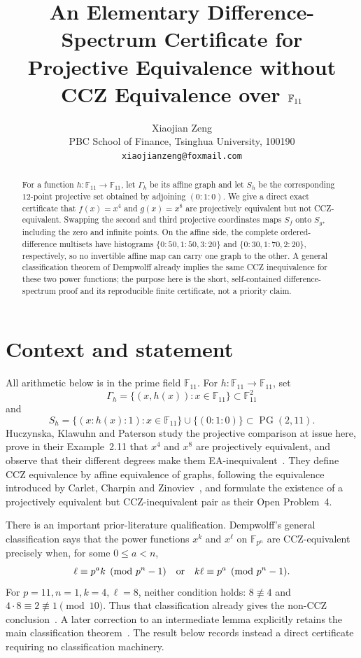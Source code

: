 \documentclass[11pt]{article}
\title{An Elementary Difference-Spectrum Certificate for\\
Projective Equivalence without CCZ Equivalence over $\F_{11}$}
\author{Xiaojian Zeng\\
PBC School of Finance, Tsinghua University, 100190\\
\texttt{xiaojianzeng@foxmail.com}}
\date{}
\newcommand{\F}{\mathbb F}
\newcommand{\PG}{\operatorname{PG}}
\begin{document}
\maketitle

\begin{abstract}
For a function $h\colon\F_{11}\to\F_{11}$, let $\Gamma_h$ be its affine
graph and let $S_h$ be the corresponding $12$-point projective set obtained
by adjoining $(0:1:0)$.  We give a direct exact certificate that
$f(x)=x^4$ and $g(x)=x^8$ are projectively equivalent but not
CCZ-equivalent.  Swapping the second and third projective coordinates maps
$S_f$ onto $S_g$, including the zero and infinite points.  On the affine
side, the complete ordered-difference multisets have histograms
$\{0:50,1:50,3:20\}$ and $\{0:30,1:70,2:20\}$, respectively, so no
invertible affine map can carry one graph to the other.  A general
classification theorem of Dempwolff already implies the same CCZ
inequivalence for these two power functions; the purpose here is the short,
self-contained difference-spectrum proof and its reproducible finite
certificate, not a priority claim.
\end{abstract}

\section{Context and statement}

All arithmetic below is in the prime field $\F_{11}$.  For
$h\colon\F_{11}\to\F_{11}$, set
\[
  \Gamma_h=\{(x,h(x)):x\in\F_{11}\}\subset\F_{11}^2
\]
and
\[
  S_h=\{(x:h(x):1):x\in\F_{11}\}\cup\{(0:1:0)\}
       \subset\PG(2,11).
\]
Huczynska, Klawuhn and Paterson study the projective comparison at
issue here, prove in their Example~2.11 that $x^4$ and $x^8$ are
projectively equivalent, and observe that their different degrees make
them EA-inequivalent~\cite{HuczynskaKlawuhnPaterson2026}.  They define CCZ
equivalence by affine equivalence of graphs, following the equivalence
introduced by Carlet, Charpin and Zinoviev~\cite{CarletCharpinZinoviev1998},
and formulate the existence of a projectively equivalent but
CCZ-inequivalent pair as their Open Problem~4.

There is an important prior-literature qualification.  Dempwolff's general
classification says that the power functions $x^k$ and $x^\ell$ on
$\F_{p^n}$ are CCZ-equivalent precisely when, for some $0\leq a<n$,
\[
 \ell\equiv p^a k\pmod{p^n-1}
 \quad\hbox{or}\quad
 k\ell\equiv p^a\pmod{p^n-1}.
\]
For $p=11,n=1,k=4,\ell=8$, neither condition holds: $8\not\equiv4$
and $4\cdot8\equiv2\not\equiv1\pmod {10}$.  Thus that classification
already gives the non-CCZ conclusion~\cite{Dempwolff2018}.  A later
correction to an intermediate lemma explicitly retains the main
classification theorem~\cite{Dempwolff2022Correction}.  The result below
records instead a direct certificate requiring no classification machinery.
\end{document}
